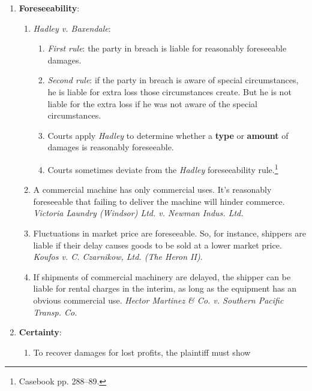 \begin{enumerate}
\begin{enumerate}
{        Inc.}\footnote{Squibbed on casebook pp. 276--77.}
        \item English courts have allowed recovery for loss of opportunity to 
        appear before the public, but American courts have not, absent 
        evidence of specific losses.
    \end{enumerate}
    \item \textbf{Foreseeability}:
    \begin{enumerate}
        \item \emph{Hadley v. Baxendale}:
        \begin{enumerate}
            \item \emph{First rule}: the party in breach is liable for 
            reasonably foreseeable damages.
            \item \emph{Second rule}: if the party in breach is aware of 
            special circumstances, he is liable for extra loss those 
            circumstances create. But he is not liable for the extra loss if 
            he was not aware of the special circumstances.
            \item Courts apply \emph{Hadley} to determine whether a 
            \textbf{type} or \textbf{amount} of damages is reasonably 
            foreseeable.
            \item Courts sometimes deviate from the \emph{Hadley} 
            foreseeability rule.\footnote{Casebook pp. 288--89.}
        \end{enumerate}
        \item A commercial machine has only commercial uses. It's reasonably 
        foreseeable that failing to deliver the machine will hinder commerce. 
        \emph{Victoria Laundry (Windsor) Ltd. v. Newman Indus. Ltd.}
        \item Fluctuations in market price are foreseeable. So, for instance, 
        shippers are liable if their delay causes goods to be sold at a lower 
        market price. \emph{Koufos v. C. Czarnikow, Ltd. (The Heron II)}.
        \item If shipments of commercial machinery are delayed, the shipper 
        can be liable for rental charges in the interim, as long as the 
        equipment has an obvious commercial use. \emph{Hector Martinez \& Co. 
        v. Southern Pacific Transp. Co.}
    \end{enumerate}
    \item \textbf{Certainty}:
    \begin{enumerate}
        \item To recover damages for lost profits, the plaintiff must show 

\end{enumerate}
\end{enumerate}
